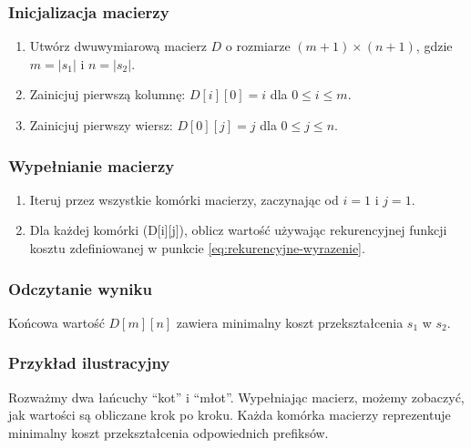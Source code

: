 \subsubsection{Inicjalizacja macierzy}
\begin{enumerate}
    \item Utwórz dwuwymiarową macierz \(D\) o rozmiarze \((m+1) \times (n+1)\), gdzie \(m = |s_1|\) i \(n = |s_2|\).
    \item Zainicjuj pierwszą kolumnę: \(D[i][0] = i\) dla \(0 \leq i \leq m\).
    \item Zainicjuj pierwszy wiersz: \(D[0][j] = j\) dla \(0 \leq j \leq n\).
\end{enumerate}

\subsubsection{Wypełnianie macierzy}
\begin{enumerate}
    \item Iteruj przez wszystkie komórki macierzy, zaczynając od \(i = 1\) i \(j = 1\).
    \item Dla każdej komórki (D[i][j]), oblicz wartość używając rekurencyjnej funkcji kosztu zdefiniowanej w punkcie \ref{eq:rekurencyjne-wyrazenie}.
\end{enumerate}

\subsubsection{Odczytanie wyniku}
Końcowa wartość \(D[m][n]\) zawiera minimalny koszt przekształcenia \(s_1\) w \(s_2\).

\subsubsection{Przykład ilustracyjny}
Rozważmy dwa łańcuchy “kot” i “młot”. Wypełniając macierz, możemy zobaczyć, jak wartości są obliczane krok po kroku. Każda komórka macierzy reprezentuje minimalny koszt przekształcenia odpowiednich prefiksów.


